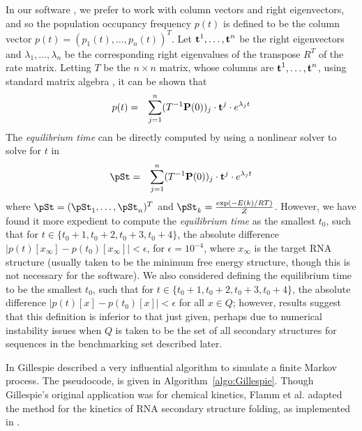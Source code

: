 In our software \hermes, we prefer to work with column vectors and
right eigenvectors, and so the population occupancy frequency
$p(t)$ is defined to be the column vector
$p(t)=(p_1(t),\ldots,p_n(t))^T$. Let
$\mbox{\bf t}^1,\ldots,\mbox{\bf t}^n$ be the right eigenvectors and
$\lambda_1,\ldots,\lambda_n$ be the corresponding right eigenvalues of the
transpose $R^T$ of the rate matrix.
Letting $T$ be the $n\times n$ matrix, whose columns are
$\mbox{\bf t}^1,\ldots,\mbox{\bf t}^n$, using standard matrix algebra
\cite{matrixTheory}, it can be shown that
\begin{align}
\label{eq:solutionMasterEquation}
p(t) &=& \sum_{j=1}^n (T^{-1}
\mbox{\bf P}(0))_j \cdot \mbox{\bf t}^j \cdot e^{\lambda_j t}
\end{align}
The {\em equilibrium time} can be directly computed by using a
nonlinear solver to solve for $t$ in
\begin{align}
\label{eq:solutionEquilibriumTime}
\pSt &=& \sum_{j=1}^n (T^{-1}
\mathbbP(0))_j \cdot \mathbbt^j \cdot e^{\lambda_j t}
\end{align}
where $\pSt= (\pSt_1,\ldots,\pSt_n)^T$ and $\pSt_k = \frac{\exp(-E(k)/RT)}{Z}$.
However, we have found it more
expedient to compute the {\em equilibrium time} as the smallest $t_0$,
such that for $t \in \{t_0+1,t_0+2,t_0+3,t_0+4\}$, the absolute difference
$|p(t)[x_{\infty}] - p(t_0)[x_{\infty}]| < \epsilon$, for $\epsilon =
10^{-4}$, where $x_{\infty}$ is the target RNA structure (usually taken
to be the minimum free energy structure, though this is not necessary for
the software). We also considered defining the equilibrium time to be the
smallest $t_0$, such that for $t \in \{t_0+1,t_0+2,t_0+3,t_0+4\}$, the
absolute difference $|p(t)[x] - p(t_0)[x]| < \epsilon$ for all $x \in
Q$; however, results suggest that this definition is inferior
to that just given, perhaps due to numerical instability issues when
$Q$ is taken to be the set of all secondary structures for sequences in
the benchmarking set described later.


In \cite{gillespieStochasticSimulation1} Gillespie described
a very influential algorithm to simulate a finite Markov process.
The pseudocode, is given in Algorithm~\ref{algo:Gillespie}.
Though Gillespie's original application was for chemical kinetics,
Flamm et al.  adapted the method for the kinetics of RNA secondary structure
folding, as implemented in \kinfold \cite{flammPhD,flamm}.


